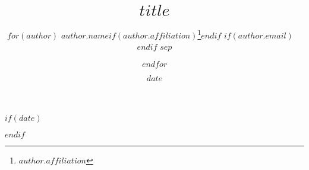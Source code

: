 %

\title{$title$}
\author{%
    $for(author)$
    $author.name$$if(author.affiliation)$\thanks{$author.affiliation$}$endif$%
    $if(author.email)$~~\href{mailto:$author.email$}{\Letter}$endif$%
    $sep$ \and
    $endfor$
}

$if(date)$
\date{$date$}
$endif$

\newcommand{\makeabstract}{
\begin{abstract}
$if(abstract)$
    $abstract$
$else$
    Please write an abstract in the \texttt{paper-meta.yaml} file.
$endif$
\end{abstract}
}
